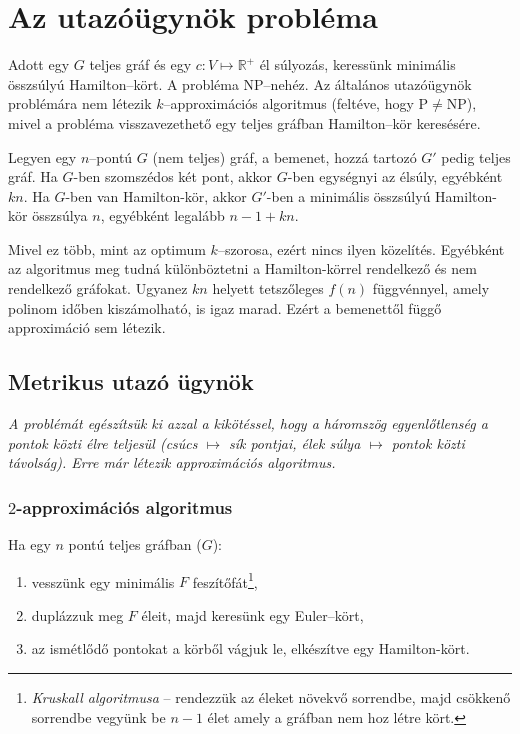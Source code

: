 \skiptooddpage
\section{Az utazóügynök probléma}

Adott egy $G$ teljes gráf és egy $c:V \mapsto \mathbb{R}^+$ él súlyozás,
keressünk minimális összsúlyú Hamilton--kört. A probléma NP--nehéz. Az általános
utazóügynök problémára nem létezik $k$--approximációs algoritmus (feltéve, hogy
P$\ne$NP), mivel a probléma visszavezethető egy teljes gráfban Hamilton--kör
keresésére.

Legyen egy $n$--pontú $G$ (nem teljes) gráf, a bemenet, hozzá tartozó $G'$ pedig
teljes gráf. Ha $G$-ben szomszédos két pont, akkor $G$-ben egységnyi az élsúly,
egyébként $kn$. Ha $G$-ben van Hamilton-kör, akkor $G'$-ben a minimális
összsúlyú Hamilton-kör összsúlya $n$, egyébként legalább $n-1+kn$.

Mivel ez több, mint az optimum $k$--szorosa, ezért nincs ilyen közelítés.
Egyébként az algoritmus meg tudná különböztetni a Hamilton-körrel rendelkező és
nem rendelkező gráfokat. Ugyanez $kn$ helyett tetszőleges $f(n)$ függvénnyel,
amely polinom időben kiszámolható, is igaz marad. Ezért a bemenettől függő
approximáció sem létezik.

\subsection{Metrikus utazó ügynök}

\emph{A problémát egészítsük ki azzal a kikötéssel, hogy a háromszög
	egyenlőtlenség a pontok közti élre teljesül (csúcs $\mapsto$ sík pontjai, élek
	súlya $\mapsto$ pontok közti távolság). Erre már létezik approximációs
	algoritmus.}

\subsubsection{$2$-approximációs algoritmus}

Ha egy $n$ pontú teljes gráfban ($G$):
\begin{enumerate}
	\item vesszünk egy minimális $F$ feszítőfát\footnote{\emph{Kruskall algoritmusa} --
		      rendezzük az éleket növekvő sorrendbe, majd csökkenő sorrendbe vegyünk be $n-1$ élet
		      amely a gráfban nem hoz létre kört.},
	\item duplázzuk meg $F$ éleit, majd keresünk egy Euler--kört,
	\item az ismétlődő pontokat a körből vágjuk le, elkészítve egy Hamilton-kört.
\end{enumerate}

